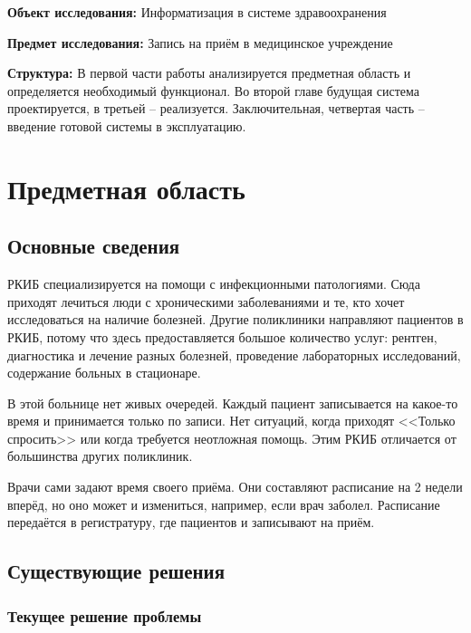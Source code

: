 \documentclass[a4paper,article]{article}
\begin{document}
\begin{sloppypar}
        \textbf{Объект исследования:} Информатизация в системе здравоохранения

        \textbf{Предмет исследования:} Запись на приём в медицинское учреждение

        \textbf{Структура:} В первой части работы анализируется предметная область и определяется необходимый функционал. Во второй главе будущая система проектируется, в третьей -- реализуется. Заключительная, четвертая часть -- введение готовой системы в эксплуатацию.

        \newpage

    \section{Предметная область}

    \subsection{Основные сведения}

        РКИБ специализируется на помощи с инфекционными патологиями. Сюда приходят лечиться люди с хроническими заболеваниями и те, кто хочет исследоваться на наличие болезней. Другие поликлиники направляют пациентов в РКИБ, потому что здесь предоставляется большое количество услуг: рентген, диагностика и лечение разных болезней, проведение лабораторных исследований, содержание больных в стационаре.

        В этой больнице нет живых очередей. Каждый пациент записывается на какое-то время и принимается только по записи. Нет ситуаций, когда приходят <<Только спросить>> или когда требуется неотложная помощь. Этим РКИБ отличается от большинства других поликлиник.

        Врачи сами задают время своего приёма. Они составляют расписание на 2 недели вперёд, но оно может и измениться, например, если врач заболел. Расписание передаётся в регистратуру, где пациентов и записывают на приём.

    \subsection{Существующие решения}

    \subsubsection{Текущее решение проблемы}\label{Текущее решение проблемы}


\end{sloppypar}
\end{document}
